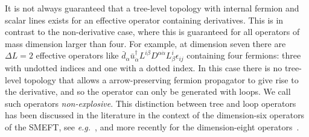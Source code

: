 It is not always guaranteed that a tree-level topology with internal fermion and
scalar lines exists for an effective operator containing derivatives. This is in
contrast to the non-derivative case, where this is guaranteed for all operators
of mass dimension larger than four. For example, at dimension seven there are
$\Delta L = 2$ effective operators like
$\bar{d}_{\alpha} \bar{u}^{\dagger}_{\dot{\alpha}} L^{i\beta} D^{\alpha \dot{\alpha}} L_{\beta}^{i} \epsilon_{ij}$
containing four fermions: three with undotted indices and one with a dotted
index. In this case there is no tree-level topology that allows a
arrow-preserving fermion propagator to give rise to the derivative, and so the
operator can only be generated with loops. We call such operators
\textit{non-explosive}. This distinction between tree and loop operators has
been discussed in the literature in the context of the dimension-six operators
of the SMEFT, see \textit{e.g.}~\cite{Arzt:1994gp, Einhorn:2013kja,
  deBlas:2017xtg}, and more recently for the dimension-eight
operators~\cite{Craig:2019wmo}.

